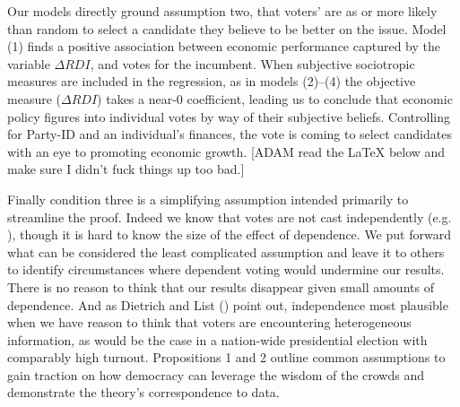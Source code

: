 \documentclass[11pt]{article}
\begin{document}
Our models directly ground assumption two, that voters' are as or more likely than random to select a candidate they believe to be better on the issue. %
Model (1) finds a positive association between economic performance captured by the variable $\Delta RDI$, and votes for the incumbent. When subjective sociotropic measures are included in the regression, as in models (2)--(4) the objective measure ($\Delta RDI$) takes a near-0 coefficient, leading us to conclude that economic policy figures into individual votes by way of their subjective beliefs. Controlling for Party-ID and an individual's finances, the vote is coming to select candidates with an eye to promoting economic growth. [ADAM read the LaTeX below and make sure I didn't fuck things up too bad.]



Finally condition three is a simplifying assumption intended primarily to streamline the proof. Indeed we know that votes are not cast independently (e.g. \citet{sinclair2012social}), though it is hard to know the size of the effect of dependence. We put forward what can be considered the least complicated assumption and leave it to others to identify circumstances where dependent voting would undermine our results. There is no reason to think that our results disappear given small amounts of dependence. And as Dietrich and List (\citeyear{Dietrich2004}) point out, independence most plausible when we have reason to think that voters are encountering heterogeneous information, as would be the case in a nation-wide presidential election with comparably high turnout. Propositions 1 and 2 outline common assumptions to gain traction on how democracy can leverage the wisdom of the crowds and demonstrate the theory's correspondence to data. 
\end{document}

